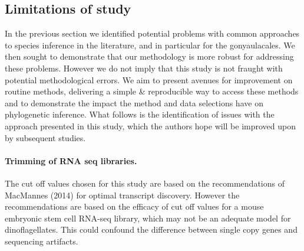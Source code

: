 \documentclass[12pt]{article}
\begin{document}
\subsection*{Limitations of study}
In the previous section we identified potential problems with common approaches to species inference in the literature, and in particular for the gonyaulacales. 
We then sought to demonstrate that our methodology is more robust for addressing these problems. 
However we do not imply that this study is not fraught with potential methodological errors. 
We aim to present avenues for improvement on routine methods, delivering a simple \& reproducible way to access these methods and to demonstrate the impact the method and data selections have on phylogenetic inference. %
What follows is the identification of issues with the approach presented in this study, which the authors hope will be improved upon by subsequent studies. 
\paragraph*{Trimming of RNA seq libraries.} The cut off values chosen for this study are based on the recommendations of MacMannes (2014) for optimal transcript discovery. 
However the recommendations are based on the efficacy of cut off values for a mouse embryonic stem cell RNA-seq library, which may not be an adequate model for dinoflagellates. 
This could confound the difference between single copy genes and sequencing artifacts.
\end{document}
